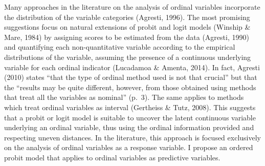 \documentclass[12pt,econ]{sources/authesis}
\begin{document}
Many approaches in the literature on the analysis of ordinal variables incorporate the distribution of the variable categories (Agresti, 1996). The most promising suggestions focus on natural extensions of probit and logit models (Winship \& Mare, 1984) by assigning scores to be estimated from the data (Agresti, 1990) and quantifying each non-quantitative variable according to the empirical distributions of the variable, assuming the presence of a continuous underlying variable for each ordinal indicator (Lucadamoa \& Amenta, 2014). In fact, Agresti (2010) states ``that the type of ordinal method used is not that crucial'' but that the ``results may be quite different, however, from those obtained using methods that treat all the variables as nominal'' (p.~3). The same applies to methods which treat ordinal variables as interval (Gertheiss \& Tutz, 2008). This suggests that a probit or logit model is suitable to uncover the latent continuous variable underlying an ordinal variable, thus using the ordinal information provided and respecting uneven distances. In the literature, this approach is focused exclusively on the analysis of ordinal variables as a response variable. I propose an ordered probit model that applies to ordinal variables as predictive variables.
\end{document}
